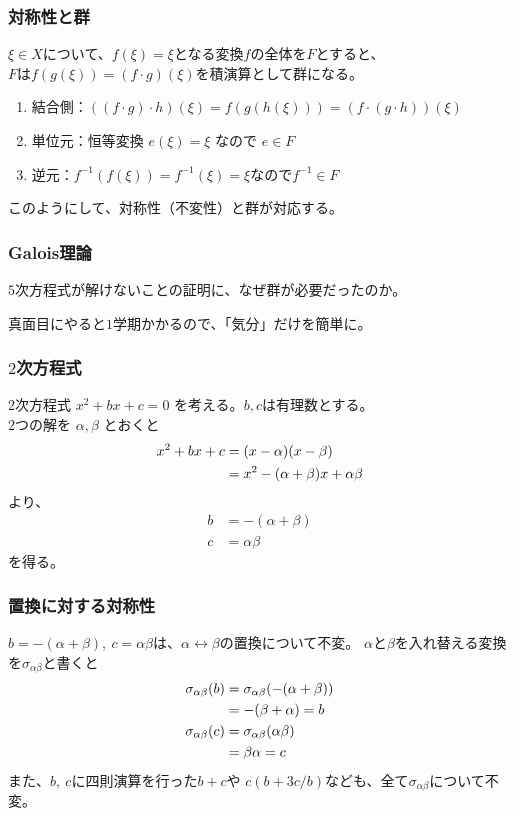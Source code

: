 \documentclass[12pt, t]{beamer}
\begin{document}
\begin{frame}
\frametitle{対称性と群}
$\xi \in X$について、$f(\xi) = \xi$となる変換$f$の全体を$F$とすると、\\
$F$は$f(g(\xi)) = (f \cdot g)(\xi)$を積演算として群になる。

\begin{enumerate}
\item 結合側：$((f \cdot g) \cdot h)(\xi) = f(g(h(\xi))) = (f \cdot (g \cdot h))(\xi)$
\item 単位元：恒等変換 $e(\xi) = \xi$ なので $e \in F$
\item 逆元：$f^{-1}(f(\xi)) = f^{-1}(\xi) = \xi$なので$f^{-1} \in F$
\end{enumerate}

このようにして、対称性（不変性）と群が対応する。
\end{frame}


\begin{frame}
\frametitle{Galois理論}
$5$次方程式が解けないことの証明に、なぜ群が必要だったのか。

真面目にやると$1$学期かかるので、「気分」だけを簡単に。
\end{frame}

\begin{frame}
\frametitle{$2$次方程式}
$2$次方程式 $x^2 + bx + c = 0$ を考える。$b, c$は有理数とする。\\
$2$つの解を $\alpha, \beta$ とおくと
\begin{align}
  x^2 + bx + c &= (x - \alpha)(x - \beta) \notag \\
  &= x^2 -(\alpha + \beta)x + \alpha \beta
\end{align}
より、
\begin{align}
  b &= -(\alpha + \beta) \\
  c &= \alpha \beta
\end{align}
を得る。
\end{frame}

\begin{frame}
\frametitle{置換に対する対称性}
$b = -(\alpha + \beta),\ c = \alpha \beta$は、$\alpha \leftrightarrow \beta$の置換について不変。
$\alpha$と$\beta$を入れ替える変換を$\sigma_{\alpha \beta}$と書くと
\begin{align}
  \sigma_{\alpha \beta}(b) &= \sigma_{\alpha \beta} (-(\alpha + \beta)) \notag \\
                           &= -(\beta + \alpha) = b \\
  \sigma_{\alpha \beta}(c) &= \sigma_{\alpha \beta}(\alpha \beta) \notag \\
                           &= \beta \alpha = c
\end{align}
また、$b,\ c$に四則演算を行った$b + c$や $c (b + 3 c/b)$なども、全て$\sigma_{\alpha \beta}$について不変。
\end{frame}
\end{document}

